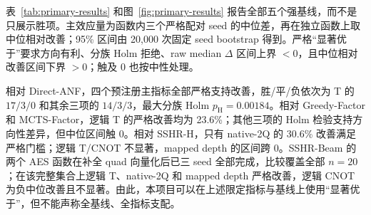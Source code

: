 \documentclass[UTF8,a4paper,12pt]{ctexart}
\newcommand{\method}{Resource-NMCTS}
\begin{document}
表~\ref{tab:primary-results} 和图~\ref{fig:primary-results} 报告全部五个强基线，而不是只展示胜项。主效应量为函数内三个严格配对 seed 的中位差，再在独立函数上取中位相对改善；95\% 区间由 20,000 次固定 seed bootstrap 得到。严格“显著优于”要求方向有利、分族 Holm 拒绝、raw median $\Delta$ 区间上界 $<0$，且中位相对改善区间下界 $>0$；触及 0 也按中性处理。

\begin{table}[tbp]
  \centering
  \scriptsize
  \caption{\method{} 相对五个基线的冻结主指标。单元为中位相对改善\% [95\% bootstrap CI]，正值有利于 \method{}；粗体满足严格门槛。$\dagger$ 表示分族 Holm 已拒绝，但至少一个中位效应区间触及或跨越 0，故不称严格显著。}
  \label{tab:primary-results}
\end{table}

相对 Direct-ANF，四个预注册主指标全部严格支持改善，胜/平/负依次为 T 的 $17/3/0$ 和其余三项的 $14/3/3$，最大分族 Holm $p_{\mathrm H}=0.00184$。相对 Greedy-Factor 和 MCTS-Factor，逻辑 T 的严格改善均为 23.6\%；其他三项的 Holm 检验支持方向性差异，但中位区间触 0。相对 SSHR-H，只有 native-2Q 的 30.6\% 改善满足严格门槛；逻辑 T/CNOT 不显著，mapped depth 的区间跨 0。SSHR-Beam 的两个 AES 函数在补全 quad 向量化后已三 seed 全部完成，比较覆盖全部 $n=20$；在该完整集合上逻辑 T、native-2Q 和 mapped depth 严格改善，逻辑 CNOT 为负中位改善且不显著。由此，本项目可以在上述限定指标与基线上使用“显著优于”，但不能声称全基线、全指标支配。
\end{document}
